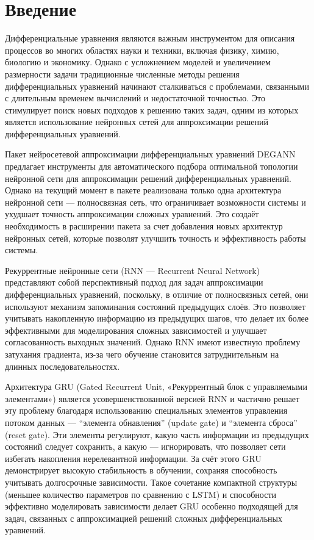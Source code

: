 
\section*{Введение}
\thispagestyle{withCompileDate}

Дифференциальные уравнения являются важным инструментом для описания процессов во многих областях науки и техники, включая физику, химию, биологию и экономику. Однако с усложнением моделей и увеличением размерности задачи традиционные численные методы решения дифференциальных уравнений начинают сталкиваться с проблемами, связанными с длительным временем вычислений и недостаточной точностью. Это стимулирует поиск новых подходов к решению таких задач, одним из которых является использование нейронных сетей для аппроксимации решений дифференциальных уравнений.

Пакет нейросетевой аппроксимации дифференциальных уравнений DEGANN предлагает инструменты для автоматического подбора оптимальной топологии нейронной сети для аппроксимации решений дифференциальных уравнений. Однако на текущий момент в пакете реализована только одна архитектура нейронной сети — полносвязная сеть, что ограничивает возможности системы и ухудшает точность аппроксимации сложных уравнений. Это создаёт необходимость в расширении пакета за счет добавления новых архитектур нейронных сетей, которые позволят улучшить точность и эффективность работы системы.

Рекуррентные нейронные сети (RNN — Recurrent Neural Network) представляют собой перспективный подход для задач аппроксимации дифференциальных уравнений, поскольку, в отличие от полносвязных сетей, они используют механизм запоминания состояний предыдущих слоёв. Это позволяет учитывать накопленную информацию из предыдущих шагов, что делает их более эффективными для моделирования сложных зависимостей и улучшает согласованность выходных значений. Однако RNN имеют известную проблему затухания градиента, из-за чего обучение становится затруднительным на длинных последовательностях.

Архитектура GRU (Gated Recurrent Unit, «Рекуррентный блок с управляемыми элементами») является усовершенствованной версией RNN и частично решает эту проблему благодаря использованию специальных элементов управления потоком данных — “элемента обнавления” (update gate) и “элемента сброса” (reset gate). Эти элементы регулируют, какую часть информации из предыдущих состояний следует сохранить, а какую — игнорировать, что позволяет сети избегать накопления нерелевантной информации. За счёт этого GRU демонстрирует высокую стабильность в обучении, сохраняя способность учитывать долгосрочные зависимости. Такое сочетание компактной структуры (меньшее количество параметров по сравнению с LSTM) и способности эффективно моделировать зависимости делает GRU особенно подходящей для задач, связанных с аппроксимацией решений сложных дифференциальных уравнений.

